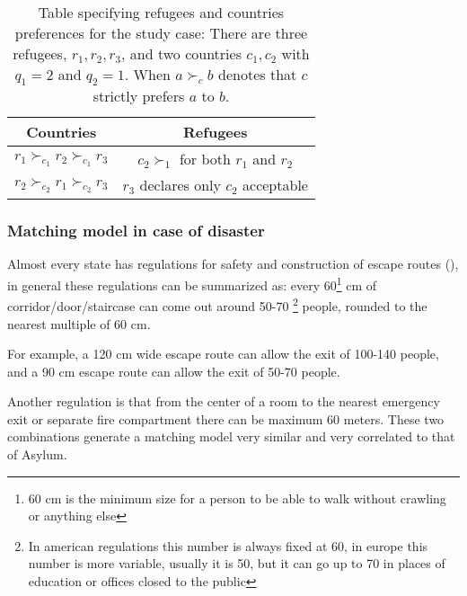 \documentclass[letterpaper]{article} %
\begin{document}
    \begin{table}[!htb]
        \begin{tabular}{c|c}
            \hline Countries                                          & Refugees                                                   \\
            \hline\( r_{1} \succ_{c_{1}} r_{2} \succ_{c_{1}} r_{3} \) & \( c_{2} \succ_{1} \) for both \( r_{1} \) and \( r_{2} \) \\
            \( r_{2} \succ_{c_{2}} r_{1} \succ_{c_{2}} r_{3} \)       & \( r_{3} \) declares only \( c_{2} \) acceptable           \\
            \hline
        \end{tabular}
        \caption{Table specifying refugees and countries preferences for
        the study case: There are three refugees, \( r _ { 1 } , r _ { 2 } , r _ { 3 } \), and two countries \( c _ { 1 } , c _ { 2 } \) with \( q _ { 1 } = 2 \) and \( q _ { 2 } = 1 \).
        When \( a \succ_{c} b \) denotes that \( c \) strictly prefers \( a \) to \( b \).}
        \label{tab:countries-refugees}
    \end{table}

    \subsubsection{Matching model in case of disaster}

    Almost every state has regulations for safety and construction of escape routes (\cite{it-81-2008,uk-1541-2005,usa-1910-1974,cee-654-1989,cee-567-1977}), in general these
    regulations can be summarized as: every 60\footnote{60 cm is the minimum size for a person to be
    able to walk without crawling or anything else} cm of corridor/door/staircase can come out around 50-70
    \footnote{In american regulations this number is always fixed at 60, in europe this number is more
    variable, usually it is 50, but it can go up to 70 in places of education or offices closed to the public}
    people, rounded to the nearest multiple of 60 cm.

    For example, a 120 cm wide escape route can allow the exit of 100-140 people, and a 90 cm
    escape route can allow the exit of 50-70 people.

    Another regulation is that from the center of a room to the nearest emergency exit or separate
    fire compartment there can be maximum 60 meters. These two combinations generate a matching model
    very similar and very correlated to that of Asylum.
\end{document}

